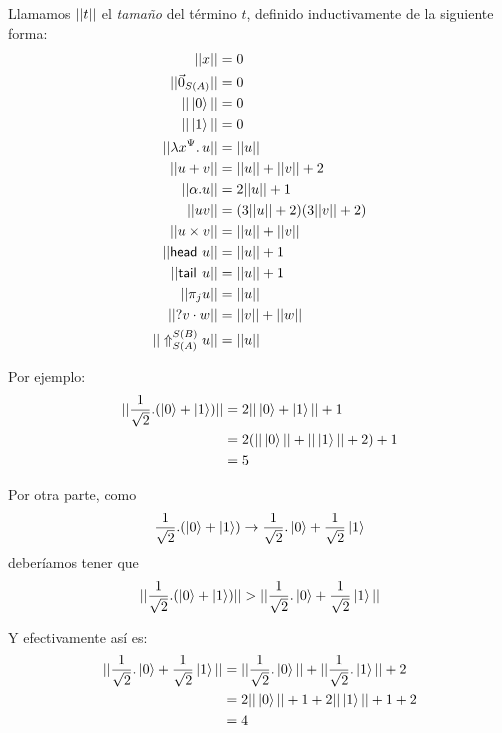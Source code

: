\begin{definition}
  Llamamos \( ||t|| \) el \textit{tamaño} del término \( t \), definido inductivamente de la siguiente forma:
  \begin{equation*}
    \begin{split}
      ||x|| & = 0 \\
      ||\vec{0}_{S (A)}|| & = 0 \\
      ||\ket{0}|| & = 0 \\
      ||\ket{1}|| & = 0 \\
      ||\lambda x^{\Psi}\ldotp u|| & = ||u|| \\
      ||u + v|| & = ||u|| + ||v|| + 2 \\
      ||\alpha . u|| & = 2 ||u|| + 1 \\
      ||u v|| & = (3 ||u|| + 2)(3 ||v|| + 2) \\
      ||u \times v|| & = ||u|| + ||v|| \\
      ||\mathsf{head}~u|| & = ||u|| + 1 \\
      ||\mathsf{tail}^{}~u|| & = ||u|| + 1 \\
      ||\pi_{j} u|| & = ||u|| \\
      ||? v \cdot w|| & = ||v|| + ||w|| \\
      ||\Uparrow_{S(A)}^{S(B)} u|| & = ||u||
    \end{split}
  \end{equation*}
\end{definition}

Por ejemplo:
\begin{equation*}
  \begin{split}
    || \frac{1}{\sqrt{2}} . (\ket{0} + \ket{1}) ||
    & = 2 || \ket{0} + \ket{1} || + 1 \\
    & = 2 (||\ket{0}|| + ||\ket{1}|| + 2) + 1 \\
    & = 5
  \end{split}
\end{equation*}

Por otra parte, como
\[ \frac{1}{\sqrt{2}} . (\ket{0} + \ket{1}) \rightarrow \frac{1}{\sqrt{2}} . \ket{0} + \frac{1}{\sqrt{2}} \ket{1} \]
deberíamos tener que
\[ ||\frac{1}{\sqrt{2}} . (\ket{0} + \ket{1})|| > ||\frac{1}{\sqrt{2}} . \ket{0} + \frac{1}{\sqrt{2}} \ket{1}|| \]

Y efectivamente así es:
\begin{equation*}
  \begin{split}
    || \frac{1}{\sqrt{2}} . \ket{0} + \frac{1}{\sqrt{2}} \ket{1} ||
    & = || \frac{1}{\sqrt{2}} . \ket{0} || + || \frac{1}{\sqrt{2}} . \ket{1} || + 2 \\
    & = 2 ||\ket{0}|| + 1 + 2 ||\ket{1}|| + 1 + 2 \\
    & = 4
  \end{split}
\end{equation*}

